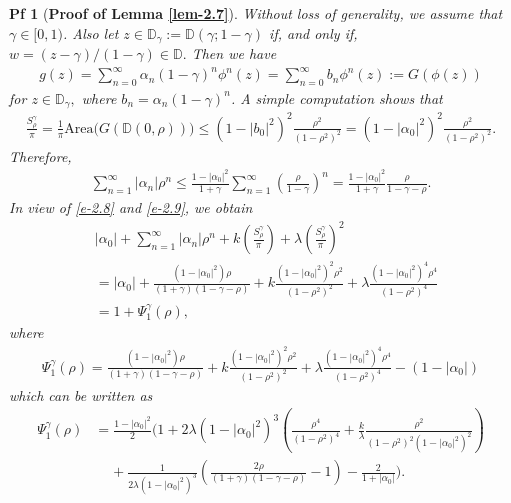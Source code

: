 \documentclass[10pt,a4paper]{amsart}
\newtheorem{pf}{Pf}
\begin{document}
\begin{pf}[\bf Proof of Lemma \ref{lem-2.7}]
	Without loss of generality, we assume that $ \gamma\in [0,1) $. Also let $ z\in\mathbb{D}_{\gamma}:=\mathbb{D}(\gamma;1-\gamma) $ if, and only if, $ w=(z-\gamma)/(1-\gamma)\in\mathbb{D}. $
	Then we have 
	\begin{align*}
		g(z)=\sum_{n=0}^{\infty}\alpha_n(1-\gamma)^n\phi^n(z)=\sum_{n=0}^{\infty}b_n\phi^n(z):=G(\phi(z))
	\end{align*}
	for $ z\in \mathbb{D}_{\gamma}, $ where $ b_n= \alpha_{n} (1-\gamma)^n$. A simple computation shows that
	\begin{align}\label{e-2.8}
		\frac{S^{\gamma}_{\rho}}{\pi}=\frac{1}{\pi}\text{Area}\bigg(G(\mathbb{D}(0,\rho))\bigg)\leq (1-|b_0|^2)^2\frac{\rho^2}{(1-\rho^2)^2}=(1-|\alpha_0|^2)^2\frac{\rho^2}{(1-\rho^2)^2}.
	\end{align}
	Therefore,
	\begin{align}\label{e-2.9}
		\sum_{n=1}^{\infty}|\alpha_n|\rho^n\leq\frac{1-|\alpha_0|^2}{1+\gamma}\sum_{n=1}^{\infty}\left(\frac{\rho}{1-\gamma}\right)^n=\frac{1-|\alpha_0|^2}{1+\gamma}\frac{\rho}{1-\gamma-\rho}.
	\end{align}
	In view of \eqref{e-2.8} and \eqref{e-2.9}, we obtain 
	\begin{align*} &
		|\alpha_0|+	\sum_{n=1}^{\infty}|\alpha_n|\rho^n+k\left(\frac{S^{\gamma}_{\rho}}{\pi}\right)+\lambda\left(\frac{S^{\gamma}_{\rho}}{\pi}\right)^2\\&= |\alpha_0|+\frac{(1-|\alpha_0|^2)\rho}{(1+\gamma)(1-\gamma-\rho)}+k\frac{(1-|\alpha_0|^2)^2\rho^2}{(1-\rho^2)^2}+\lambda\frac{(1-|\alpha_0|^2)^4\rho^4}{(1-\rho^2)^4}\\&= 1+\Psi_1^{\gamma}(\rho),
	\end{align*}
	where 
	\begin{align*}
		\Psi_1^{\gamma}(\rho)=\frac{(1-|\alpha_0|^2)\rho}{(1+\gamma)(1-\gamma-\rho)}+k\frac{(1-|\alpha_0|^2)^2\rho^2}{(1-\rho^2)^2}+\lambda\frac{(1-|\alpha_0|^2)^4\rho^4}{(1-\rho^2)^4}-(1-|\alpha_0|)
	\end{align*}
	which can be written as 
	\begin{align*} 
		\Psi_1^{\gamma}(\rho)&=\frac{1-|\alpha_0|^2}{2}\bigg(1+2\lambda(1-|\alpha_0|^2)^3 \left(\frac{\rho^4}{(1-\rho^2)^4}+\frac{k}{\lambda}\frac{\rho^2}{(1-\rho^2)^2(1-|\alpha_0|^2)^2}\right)\\&\;\;\;\;+\frac{1}{2\lambda(1-|\alpha_0|^2)^3}\left(\frac{2\rho}{(1+\gamma)(1-\gamma-\rho)}-1\right)-\frac{2}{1+|\alpha_0|}\bigg).
	\end{align*}

\end{pf}
\end{document}
